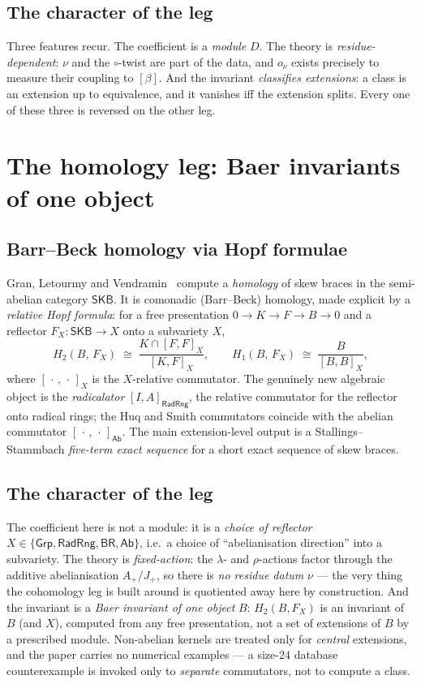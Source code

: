 \documentclass[11pt]{article}
\theoremstyle{definition}
\newcommand{\SKB}{\mathsf{SKB}}
\newcommand{\Grp}{\mathsf{Grp}}
\newcommand{\Ab}{\mathsf{Ab}}
\newcommand{\RadRng}{\mathsf{RadRng}}
\newcommand{\BR}{\mathsf{BR}}
\begin{document}
\subsection{The character of the leg}
Three features recur. The coefficient is a \emph{module} $D$. The theory is
\emph{residue-dependent}: $\nu$ and the $\circ$-twist are part of the data, and $o_\nu$ exists
precisely to measure their coupling to $[\beta]$. And the invariant \emph{classifies
extensions}: a class is an extension up to equivalence, and it vanishes iff the extension
splits. Every one of these three is reversed on the other leg.

\section{The homology leg: Baer invariants of one object}\label{sec:hom}

\subsection{Barr--Beck homology via Hopf formulae}
Gran, Letourmy and Vendramin~\cite{GLV} compute a \emph{homology} of skew braces in the
semi-abelian category $\SKB$. It is comonadic (Barr--Beck) homology, made explicit by a
\emph{relative Hopf formula}: for a free presentation $0\to K\to F\to B\to0$ and a reflector
$F_X\colon\SKB\to X$ onto a subvariety $X$,
\begin{equation}\label{eq:hopf}
H_2(B,\,F_X) \;\cong\; \frac{K\cap[F,F]_X}{[K,F]_X},
\qquad
H_1(B,\,F_X) \;\cong\; \frac{B}{[B,B]_X},
\end{equation}
where $[\,\cdot\,,\,\cdot\,]_X$ is the $X$-relative commutator. The genuinely new algebraic
object is the \emph{radicalator} $[I,A]_{\RadRng}$, the relative commutator for the reflector
onto radical rings; the Huq and Smith commutators coincide with the abelian commutator
$[\,\cdot\,,\,\cdot\,]_{\Ab}$. The main extension-level output is a Stallings--Stammbach
\emph{five-term exact sequence} for a short exact sequence of skew braces.

\subsection{The character of the leg}
The coefficient here is not a module: it is a \emph{choice of reflector}
$X\in\{\Grp,\RadRng,\BR,\Ab\}$, i.e.\ a choice of ``abelianisation direction'' into a
subvariety. The theory is \emph{fixed-action}: the $\lambda$- and $\rho$-actions factor
through the additive abelianisation $A_+/J_+$, so there is \emph{no residue datum} $\nu$ ---
the very thing the cohomology leg is built around is quotiented away here by construction.
And the invariant is a \emph{Baer invariant of one object} $B$: $H_2(B,F_X)$ is an invariant
of $B$ (and $X$), computed from any free presentation, not a set of extensions of $B$ by a
prescribed module. Non-abelian kernels are treated only for \emph{central} extensions, and
the paper carries no numerical examples --- a size-$24$ database counterexample is invoked
only to \emph{separate} commutators, not to compute a class.
\end{document}
